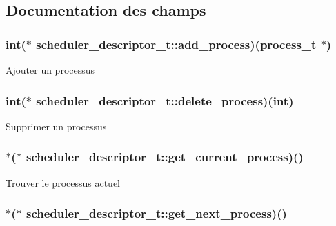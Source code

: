 \subsection{Documentation des champs}
\hypertarget{structscheduler__descriptor__t_a8919a05ae907a4b642563078a28e744a}{
\subsubsection[{add\+\_\+process}]{\setlength{\rightskip}{0pt plus 5cm}int($\ast$ scheduler\+\_\+descriptor\+\_\+t\+::add\+\_\+process)({\bf process\+\_\+t} $\ast$)}}\label{structscheduler__descriptor__t_a8919a05ae907a4b642563078a28e744a}
Ajouter un processus \hypertarget{structscheduler__descriptor__t_a656d41ddd8d861d0ee55523de3693dfa}{
\subsubsection[{delete\+\_\+process}]{\setlength{\rightskip}{0pt plus 5cm}int($\ast$ scheduler\+\_\+descriptor\+\_\+t\+::delete\+\_\+process)(int)}}\label{structscheduler__descriptor__t_a656d41ddd8d861d0ee55523de3693dfa}
Supprimer un processus \hypertarget{structscheduler__descriptor__t_a077b3b95ecf49c9dacc40b6a87cb1008}{
\subsubsection[{get\+\_\+current\+\_\+process}]{$\ast$($\ast$ scheduler\+\_\+descriptor\+\_\+t\+::get\+\_\+current\+\_\+process)()}}\label{structscheduler__descriptor__t_a077b3b95ecf49c9dacc40b6a87cb1008}
Trouver le processus actuel \hypertarget{structscheduler__descriptor__t_a41661a5080062b563df01dfb1a02e22e}{
\subsubsection[{get\+\_\+next\+\_\+process}]{$\ast$($\ast$ scheduler\+\_\+descriptor\+\_\+t\+::get\+\_\+next\+\_\+process)()}}\label{structscheduler__descriptor__t_a41661a5080062b563df01dfb1a02e22e}
